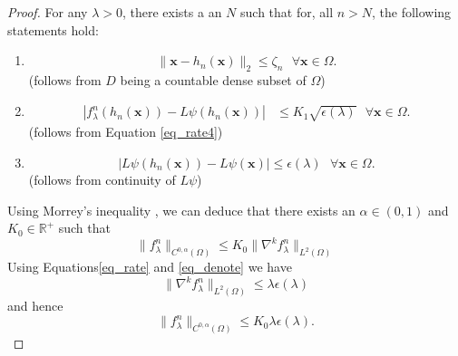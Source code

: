 \documentclass[multixcb]{amstext-l}
\theoremstyle{plain}
\theoremstyle{definition}
\theoremstyle{definition}
\theoremstyle{remark}
\numberwithin{equation}{chapter}
\begin{document}
\begin{proof}
For any $\lambda>0$, there exists a an $N$ such that for, all $n>N$, the following statements hold: 
\begin{enumerate}
    \item {\begin{equation}\label{dense}
        \|\boldsymbol{x}-h_n(\boldsymbol{x})\|_2\le \zeta_n \mbox{   }\forall \boldsymbol{x}\in\Omega.
    \end{equation} (follows from $D$ being a countable dense subset of $\Omega$)}\\
    \item{\begin{equation}\label{cond_1}\begin{aligned}
      \left|f^n_{\lambda}(h_n(\boldsymbol{x}))-L\psi(h_n(\boldsymbol{x})) \right|&\le K_1\sqrt{\epsilon(\lambda)} \mbox{            }\forall \boldsymbol{x}\in\Omega.
        \end{aligned}
    \end{equation} (follows from Equation \ref{eq_rate4})}\\
    \item{\begin{equation}\label{psi_contn}
        \left|L\psi(h_n(\boldsymbol{x})) - L\psi(\boldsymbol{x})\right| \le \epsilon(\lambda)  \mbox{   }\forall \boldsymbol{x}\in\Omega.
    \end{equation} (follows from continuity of $L\psi$)}\\
\end{enumerate}



Using Morrey's inequality \cite{evans1998partial}, we can deduce that there exists an $\alpha \in (0,1)$ and $K_0\in\mathbb{R}^+$ such that 
\begin{equation}\label{holder}
    \| f^n_{\lambda} \|_{C^{0,\alpha}(\Omega)} \le K_0\| \nabla^k f^n_{\lambda}\|_{L^2(\Omega)}
\end{equation}
Using Equations\ref{eq_rate} and \ref{eq_denote} we have \begin{equation}\label{eq_grad_denote}
\| \nabla^k f^n_{\lambda}\|_{L^2(\Omega)} \le \lambda\epsilon(\lambda)
\end{equation}
and hence
\begin{equation}\label{hcond}
    \| f^n_{\lambda} \|_{C^{0,\alpha}(\Omega)} \le K_0\lambda\epsilon(\lambda).
\end{equation}


\end{proof}
\end{document}
